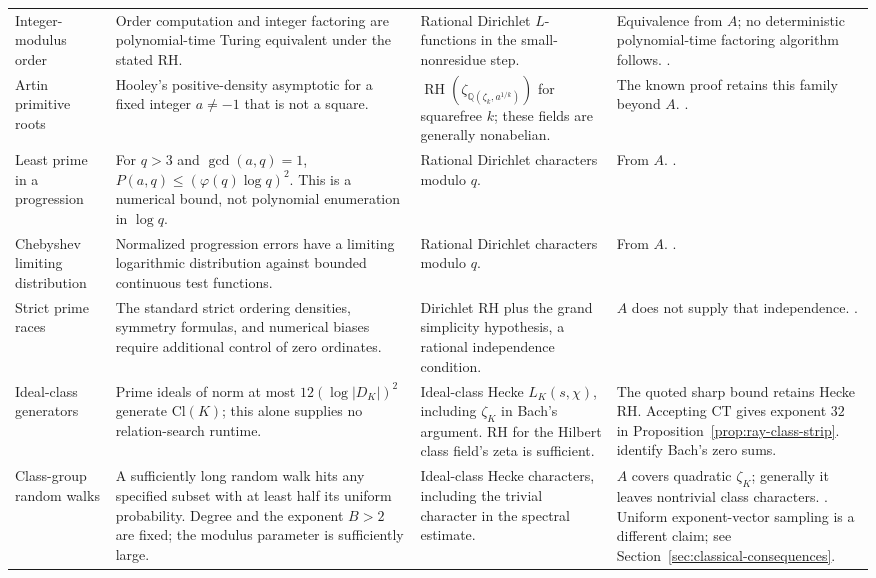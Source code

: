 \documentclass[11pt]{article}
\newcommand{\Q}{\mathbb Q}
\newcommand{\RH}{\operatorname{RH}}
\theoremstyle{definition}
\theoremstyle{remark}
\begin{document}
\begin{longtable}{@{}p{}p{}p{}p{}@{}}
Integer-modulus order & Order computation and integer factoring are polynomial-time Turing equivalent under the stated RH. & Rational Dirichlet $L$-functions in the small-nonresidue step. & Equivalence from $A$; no deterministic polynomial-time factoring algorithm follows. \citet[Thm.~4, pp.~311--312; appendix pp.~315--316]{Miller1976}. \\
Artin primitive roots & Hooley's positive-density asymptotic for a fixed integer $a\ne-1$ that is not a square. & $\RH(\zeta_{\Q(\zeta_k,a^{1/k})})$ for squarefree $k$; these fields are generally nonabelian. & The known proof retains this family beyond $A$. \citet[translation pp.~40--45, 47]{Hooley1967}. \\
Least prime in a progression & For $q>3$ and $\gcd(a,q)=1$, $P(a,q)\le(\varphi(q)\log q)^2$. This is a numerical bound, not polynomial enumeration in $\log q$. & Rational Dirichlet characters modulo $q$. & From $A$. \citet[Cor.~1.2, corrected author p.~3]{LLS2015}. \\
Chebyshev limiting distribution & Normalized progression errors have a limiting logarithmic distribution against bounded continuous test functions. & Rational Dirichlet characters modulo $q$. & From $A$. \citet[Thm.~1.1, p.~174]{RubinsteinSarnak1994}. \\
Strict prime races & The standard strict ordering densities, symmetry formulas, and numerical biases require additional control of zero ordinates. & Dirichlet RH plus the grand simplicity hypothesis, a rational independence condition. & $A$ does not supply that independence. \citet[pp.~176--177]{RubinsteinSarnak1994}. \\
Ideal-class generators & Prime ideals of norm at most $12(\log|D_K|)^2$ generate $\mathrm{Cl}(K)$; this alone supplies no relation-search runtime. & Ideal-class Hecke $L_K(s,\chi)$, including $\zeta_K$ in Bach's argument. RH for the Hilbert class field's zeta is sufficient. & The quoted sharp bound retains Hecke RH. Accepting $\mathrm{CT}$ gives exponent $32$ in Proposition~\ref{prop:ray-class-strip}. \citet[author pp.~2--3]{BDF2008} identify Bach's zero sums. \\
Class-group random walks & A sufficiently long random walk hits any specified subset with at least half its uniform probability. Degree and the exponent $B>2$ are fixed; the modulus parameter is sufficiently large. & Ideal-class Hecke characters, including the trivial character in the spectral estimate. & $A$ covers quadratic $\zeta_K$; generally it leaves nontrivial class characters. \citet[Cor.~1.3, author p.~4; proof pp.~9--10]{JMV2009}. Uniform exponent-vector sampling is a different claim; see Section~\ref{sec:classical-consequences}. \\

\end{longtable}
\end{document}
